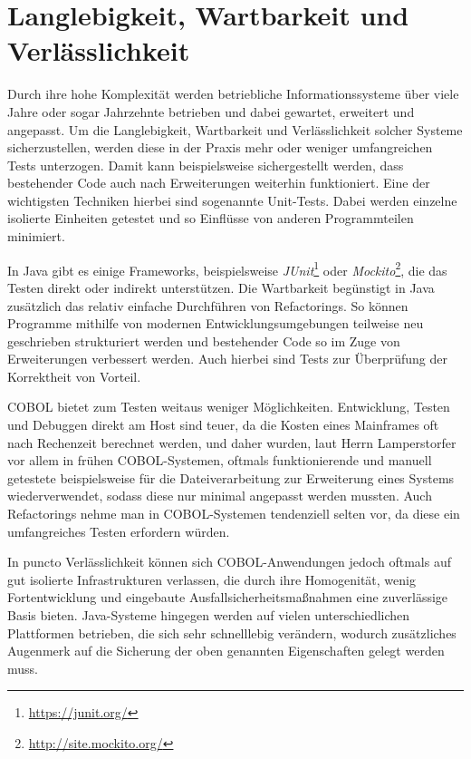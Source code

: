 \section{Langlebigkeit, Wartbarkeit und Verlässlichkeit} \label{verlaesslichkeit}

Durch ihre hohe Komplexität werden betriebliche Informationssysteme \idR über viele Jahre oder sogar Jahrzehnte betrieben und dabei gewartet, erweitert und angepasst. Um die Langlebigkeit, Wartbarkeit und Verlässlichkeit solcher Systeme sicherzustellen, werden diese in der Praxis mehr oder weniger umfangreichen Tests unterzogen. Damit kann beispielsweise sichergestellt werden, dass bestehender Code auch nach Erweiterungen weiterhin funktioniert. Eine der wichtigsten Techniken hierbei sind sogenannte Unit-Tests. Dabei werden einzelne isolierte Einheiten getestet und so Einflüsse von anderen Programmteilen minimiert. 

In Java gibt es einige Frameworks, beispielsweise \textit{JUnit}\footnote{\url{https://junit.org/} \visitedOn} oder \textit{Mockito}\footnote{\url{http://site.mockito.org/} \visitedOn}, die das Testen direkt oder indirekt unterstützen. Die Wartbarkeit begünstigt in Java zusätzlich das relativ einfache Durchführen von Refactorings. So können Programme mithilfe von modernen Entwicklungsumgebungen teilweise neu geschrieben \bzw strukturiert werden und bestehender Code so im Zuge von Erweiterungen verbessert werden. Auch hierbei sind Tests zur Überprüfung der Korrektheit von Vorteil. 

COBOL bietet zum Testen weitaus weniger Möglichkeiten. Entwicklung, Testen und Debuggen direkt am Host sind teuer, da die Kosten eines Mainframes oft nach Rechenzeit berechnet werden, und daher wurden, laut Herrn Lamperstorfer vor allem in frühen COBOL-Systemen, oftmals funktionierende und manuell getestete  beispielsweise für die Dateiverarbeitung zur Erweiterung eines Systems wiederverwendet, sodass diese nur minimal angepasst werden mussten. Auch Refactorings nehme man in COBOL-Systemen tendenziell selten vor, da diese ein umfangreiches Testen erfordern würden.

In puncto Verlässlichkeit können sich COBOL-Anwendungen jedoch oftmals auf gut isolierte Infrastrukturen verlassen, die durch ihre Homogenität, wenig Fortentwicklung und eingebaute Ausfallsicherheitsmaßnahmen eine zuverlässige Basis bieten. Java-Systeme hingegen werden auf vielen unterschiedlichen Plattformen betrieben, die sich sehr schnelllebig verändern, wodurch zusätzliches Augenmerk auf die Sicherung der oben genannten Eigenschaften gelegt werden muss.